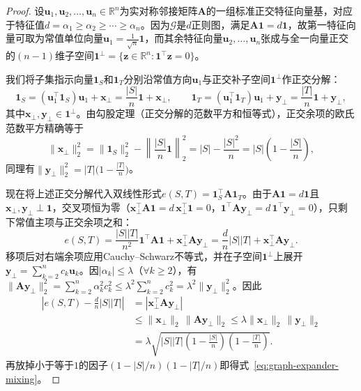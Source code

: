 \begin{proof}
设$\bm u_1,\bm u_2,\ldots,\bm u_n\in\mathbb R^n$为实对称邻接矩阵$\bm A$的一组标准正交特征向量基，对应于特征值$d=\alpha_1\ge\alpha_2\ge\cdots\ge\alpha_n$。因为$\mathcal G$是$d$正则图，满足$\bm A\bm 1=d\bm 1$，故第一特征向量可取为常值单位向量$\bm u_1=\frac{1}{\sqrt n}\bm 1$，而其余特征向量$\bm u_2,\ldots,\bm u_n$张成与全一向量正交的$(n-1)$维子空间$\bm 1^\perp=\{\bm z\in\mathbb R^n:\bm 1^\top\bm z=0\}$。

我们将子集指示向量$\bm 1_S$和$\bm 1_T$分别沿常值方向$\bm u_1$与正交补子空间$\bm 1^\perp$作正交分解：
\[
\bm 1_S = (\bm u_1^\top\bm 1_S)\bm u_1 + \bm x_\perp = \frac{|S|}{n}\bm 1 + \bm x_\perp,
\qquad
\bm 1_T = (\bm u_1^\top\bm 1_T)\bm u_1 + \bm y_\perp = \frac{|T|}{n}\bm 1 + \bm y_\perp,
\]
其中$\bm x_\perp,\bm y_\perp\in\bm 1^\perp$。由勾股定理（正交分解的范数平方和恒等式），正交余项的欧氏范数平方精确等于
\[
\lVert\bm x_\perp\rVert_2^2
= \lVert\bm 1_S\rVert_2^2 - \left\lVert\frac{|S|}{n}\bm 1\right\rVert_2^2
= |S| - \frac{|S|^2}{n}
= |S|\left(1-\frac{|S|}{n}\right),
\]
同理有$\lVert\bm y_\perp\rVert_2^2=|T|\bigl(1-\frac{|T|}{n}\bigr)$。

现在将上述正交分解代入双线性形式$e(S,T)=\bm 1_S^\top\bm A\bm 1_T$。由于$\bm A\bm 1=d\bm 1$且$\bm x_\perp,\bm y_\perp\perp\bm 1$，交叉项恒为零（$\bm x_\perp^\top\bm A\bm 1=d\,\bm x_\perp^\top\bm 1=0$，$\bm 1^\top\bm A\bm y_\perp=d\,\bm 1^\top\bm y_\perp=0$），只剩下常值主项与正交余项之和：
\[
e(S,T)
= \frac{|S||T|}{n^2}\bm 1^\top\bm A\bm 1 + \bm x_\perp^\top\bm A\bm y_\perp
= \frac{d}{n}|S||T| + \bm x_\perp^\top\bm A\bm y_\perp.
\]
移项后对右端余项应用Cauchy--Schwarz不等式，并在子空间$\bm 1^\perp$上展开$\bm y_\perp=\sum_{k=2}^n c_k\bm u_k$。因$|\alpha_k|\le\lambda$（$\forall k\ge 2$），有$\lVert\bm A\bm y_\perp\rVert_2^2=\sum_{k=2}^n\alpha_k^2 c_k^2\le\lambda^2\sum_{k=2}^n c_k^2=\lambda^2\lVert\bm y_\perp\rVert_2^2$。因此
\[
\begin{aligned}
\left|e(S,T)-\frac{d}{n}|S||T|\right|
&=|\bm x_\perp^\top\bm A\bm y_\perp|\\
&\leq\lVert\bm x_\perp\rVert_2\,\lVert\bm A\bm y_\perp\rVert_2
\leq\lambda\lVert\bm x_\perp\rVert_2\,\lVert\bm y_\perp\rVert_2\\
&=\lambda\sqrt{|S||T|\left(1-\frac{|S|}{n}\right)\left(1-\frac{|T|}{n}\right)}.
\end{aligned}
\]
再放掉小于等于$1$的因子$(1-|S|/n)(1-|T|/n)$即得式~\eqref{eq:graph-expander-mixing}。
\end{proof}

